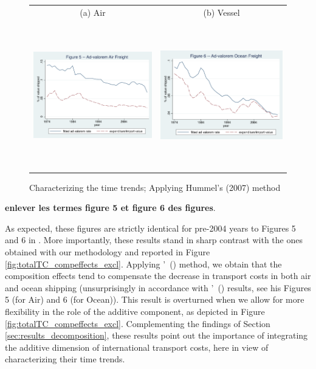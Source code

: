 \documentclass[a4paper,11pt]{article}
\newcommand\citeh[1]{\citeauthor{#1}'\ (\citeyear{#1})}
\begin{document}
\begin{figure}[htbp]
\caption{Characterizing the time trends; Applying Hummel's (2007) method }
\label{fig:comp_effects_as_in_Hummels}
\begin{center}
\begin{tabular}{cc}
{\small (a) Air } & {\small (b) Vessel}\\
\includegraphics[width=3in, height=2.5in]{figure5_comme_hummels.pdf}
& \includegraphics[width=3in,height=2.5in]{figure6_comme_hummels.pdf} \\
\end{tabular}
\end{center}
\end{figure}

\textbf{enlever les termes figure 5 et figure 6 des figures}.

As expected, these figures are strictly identical for pre-2004 years to Figures 5 and 6 in \citet{hummels2007}. More importantly, these results stand in sharp contrast with the ones obtained with our methodology and reported in Figure \ref{fig:totalTC_compeffects_excl}. Applying \citeh{hummels2007} method, we obtain that the composition effects tend to compensate the decrease in transport costs in both air and ocean shipping (unsurprisingly in accordance with \citeh{hummels2007} results, see his Figures 5 (for Air) and 6 (for Ocean)). This result is overturned when we allow for more flexibility in the role of the additive component, as depicted in Figure \ref{fig:totalTC_compeffects_excl}. Complementing the findings of Section \ref{sec:results_decomposition}, these results point out the importance of integrating the additive dimension of international transport costs, here in view of characterizing their time trends.
\end{document}

